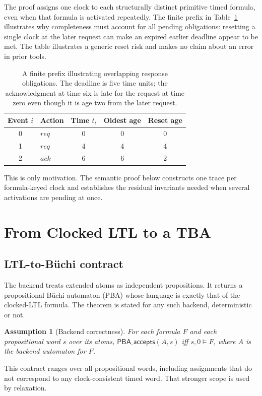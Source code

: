 \documentclass{ieeeaccess}
\newtheorem{assumption}[theorem]{Assumption}
\begin{document}
The proof assigns one clock to each structurally distinct primitive timed
formula, even when that formula is activated repeatedly. The finite prefix in
Table~\ref{tab:overlap-example} illustrates why completeness must account for
all pending obligations: resetting a single clock at the later request can
make an expired earlier deadline appear to be met. The table illustrates a
generic reset risk and makes no claim about an error in prior tools.
\begin{table}[t]
\centering
\caption{A finite prefix illustrating overlapping response obligations.
The deadline is five time units; the acknowledgment at time six is late for
the request at time zero even though it is age two from the later request.}
\label{tab:overlap-example}
\begin{tabular}{@{}clccc@{}}
\toprule
Event $i$ & Action & Time $t_i$ & Oldest age & Reset age\\
\midrule
0 & $\mathit{req}$ & 0 & 0 & 0\\
1 & $\mathit{req}$ & 4 & 4 & 4\\
2 & $\mathit{ack}$ & 6 & 6 & 2\\
\bottomrule
\end{tabular}
\end{table}
This is only motivation. The semantic proof below constructs one trace per
formula-keyed clock and establishes the residual invariants needed when
several activations are pending at once.

\section{From Clocked LTL to a TBA}
\label{sec:tba-construction}
\subsection{LTL-to-B\"uchi contract}
The backend treats extended atoms as independent propositions. It returns a
propositional B\"uchi automaton (PBA) whose language is exactly that of the
clocked-LTL formula. The theorem is stated for any such backend, deterministic
or not.
\begin{assumption}[Backend correctness]
\label{ass:backend}
For each formula $F$ and each propositional word $s$ over its atoms,
$\mathsf{PBA\_accepts}(A,s)$ iff $s,0\models F$, where $A$ is the backend
automaton for $F$.
\end{assumption}
This contract ranges over all propositional words, including assignments
that do not correspond to any clock-consistent timed word. That stronger
scope is used by relaxation.
\end{document}
